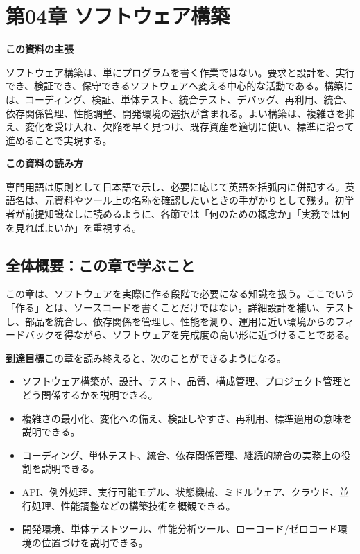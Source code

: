 \section{第04章 ソフトウェア構築}
\noindent\textbf{この資料の主張}

ソフトウェア構築は、単にプログラムを書く作業ではない。要求と設計を、実行でき、検証でき、保守できるソフトウェアへ変える中心的な活動である。構築には、コーディング、検証、単体テスト、統合テスト、デバッグ、再利用、統合、依存関係管理、性能調整、開発環境の選択が含まれる。よい構築は、複雑さを抑え、変化を受け入れ、欠陥を早く見つけ、既存資産を適切に使い、標準に沿って進めることで実現する。

\begin{plainbox}
\textbf{この資料の読み方}

専門用語は原則として日本語で示し、必要に応じて英語を括弧内に併記する。英語名は、元資料やツール上の名称を確認したいときの手がかりとして残す。初学者が前提知識なしに読めるように、各節では「何のための概念か」「実務では何を見ればよいか」を重視する。
\end{plainbox}

\subsection*{全体概要：この章で学ぶこと}

この章は、ソフトウェアを実際に作る段階で必要になる知識を扱う。ここでいう「作る」とは、ソースコードを書くことだけではない。詳細設計を補い、テストし、部品を統合し、依存関係を管理し、性能を測り、運用に近い環境からのフィードバックを得ながら、ソフトウェアを完成度の高い形に近づけることである。

\noindent\textbf{到達目標}\quad この章を読み終えると、次のことができるようになる。

\begin{itemize}
  \item ソフトウェア構築が、設計、テスト、品質、構成管理、プロジェクト管理とどう関係するかを説明できる。
  \item 複雑さの最小化、変化への備え、検証しやすさ、再利用、標準適用の意味を説明できる。
  \item コーディング、単体テスト、統合、依存関係管理、継続的統合の実務上の役割を説明できる。
  \item API、例外処理、実行可能モデル、状態機械、ミドルウェア、クラウド、並行処理、性能調整などの構築技術を概観できる。
  \item 開発環境、単体テストツール、性能分析ツール、ローコード/ゼロコード環境の位置づけを説明できる。
\end{itemize}

